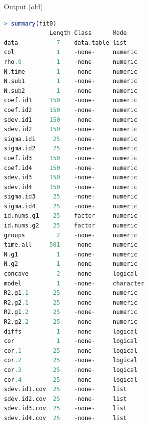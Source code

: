 \documentclass{beamer}
\begin{document}
\begin{frame}[fragile]{Output (old)}
\lstset{basicstyle=\tiny\ttfamily, style = rstyle}
\begin{lstlisting}[language=R, showstringspaces=false,deletekeywords={data,col,time,c,factor, summary, numeric,table,list,coef, all, model, logical, character}]
> summary(fit0)
             Length Class      Mode     
data           7    data.table list     
col            1    -none-     numeric  
rho.0          1    -none-     numeric  
N.time         1    -none-     numeric  
N.sub1         1    -none-     numeric  
N.sub2         1    -none-     numeric  
coef.id1     150    -none-     numeric  
coef.id2     150    -none-     numeric  
sdev.id1     150    -none-     numeric  
sdev.id2     150    -none-     numeric  
sigma.id1     25    -none-     numeric  
sigma.id2     25    -none-     numeric  
coef.id3     150    -none-     numeric  
coef.id4     150    -none-     numeric  
sdev.id3     150    -none-     numeric  
sdev.id4     150    -none-     numeric  
sigma.id3     25    -none-     numeric  
sigma.id4     25    -none-     numeric  
id.nums.g1    25    factor     numeric  
id.nums.g2    25    factor     numeric  
groups         2    -none-     numeric  
time.all     501    -none-     numeric  
N.g1           1    -none-     numeric  
N.g2           1    -none-     numeric  
concave        2    -none-     logical  
model          1    -none-     character
R2.g1.1       25    -none-     numeric  
R2.g2.1       25    -none-     numeric  
R2.g1.2       25    -none-     numeric  
R2.g2.2       25    -none-     numeric  
diffs          1    -none-     logical  
cor            1    -none-     logical  
cor.1         25    -none-     logical  
cor.2         25    -none-     logical  
cor.3         25    -none-     logical  
cor.4         25    -none-     logical  
sdev.id1.cov  25    -none-     list     
sdev.id2.cov  25    -none-     list     
sdev.id3.cov  25    -none-     list     
sdev.id4.cov  25    -none-     list     
\end{lstlisting}
\end{frame}
\end{document}
